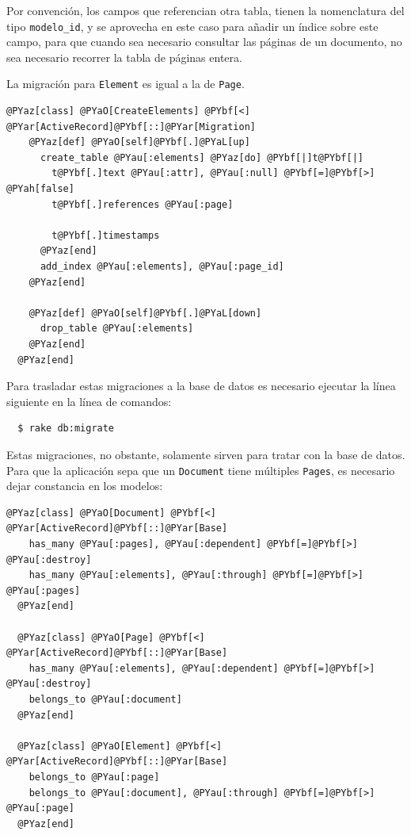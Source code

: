 Por convención, los campos que referencian otra tabla, tienen la nomenclatura del tipo \texttt{modelo\_id}, y se aprovecha en este caso para añadir un índice sobre este campo, para que cuando sea necesario consultar las páginas de un documento, no sea necesario recorrer la tabla de páginas entera.

La migración para \texttt{Element} es igual a la de \texttt{Page}.

\begin{Verbatim}[commandchars=@\[\]]
  @PYaz[class] @PYaO[CreateElements] @PYbf[<] @PYar[ActiveRecord]@PYbf[::]@PYar[Migration]
    @PYaz[def] @PYaO[self]@PYbf[.]@PYaL[up]
      create_table @PYau[:elements] @PYaz[do] @PYbf[|]t@PYbf[|]
        t@PYbf[.]text @PYau[:attr], @PYau[:null] @PYbf[=]@PYbf[>] @PYah[false] 
        t@PYbf[.]references @PYau[:page]

        t@PYbf[.]timestamps
      @PYaz[end]
      add_index @PYau[:elements], @PYau[:page_id]
    @PYaz[end]

    @PYaz[def] @PYaO[self]@PYbf[.]@PYaL[down]
      drop_table @PYau[:elements]
    @PYaz[end]
  @PYaz[end]
\end{Verbatim}

%
%

Para trasladar estas migraciones a la base de datos es necesario ejecutar la línea siguiente en la línea de comandos:

\begin{verbatim}
  $ rake db:migrate
\end{verbatim}

Estas migraciones, no obstante, solamente sirven para tratar con la base de datos. Para que la aplicación sepa que un \texttt{Document} tiene múltiples \texttt{Pages}, es necesario dejar constancia en los modelos:

\begin{Verbatim}[commandchars=@\[\]]
  @PYaz[class] @PYaO[Document] @PYbf[<] @PYar[ActiveRecord]@PYbf[::]@PYar[Base]
    has_many @PYau[:pages], @PYau[:dependent] @PYbf[=]@PYbf[>] @PYau[:destroy]
    has_many @PYau[:elements], @PYau[:through] @PYbf[=]@PYbf[>] @PYau[:pages]
  @PYaz[end]

  @PYaz[class] @PYaO[Page] @PYbf[<] @PYar[ActiveRecord]@PYbf[::]@PYar[Base]
    has_many @PYau[:elements], @PYau[:dependent] @PYbf[=]@PYbf[>] @PYau[:destroy]
    belongs_to @PYau[:document]
  @PYaz[end]
  
  @PYaz[class] @PYaO[Element] @PYbf[<] @PYar[ActiveRecord]@PYbf[::]@PYar[Base]
    belongs_to @PYau[:page]
    belongs_to @PYau[:document], @PYau[:through] @PYbf[=]@PYbf[>] @PYau[:page]
  @PYaz[end]
\end{Verbatim}

